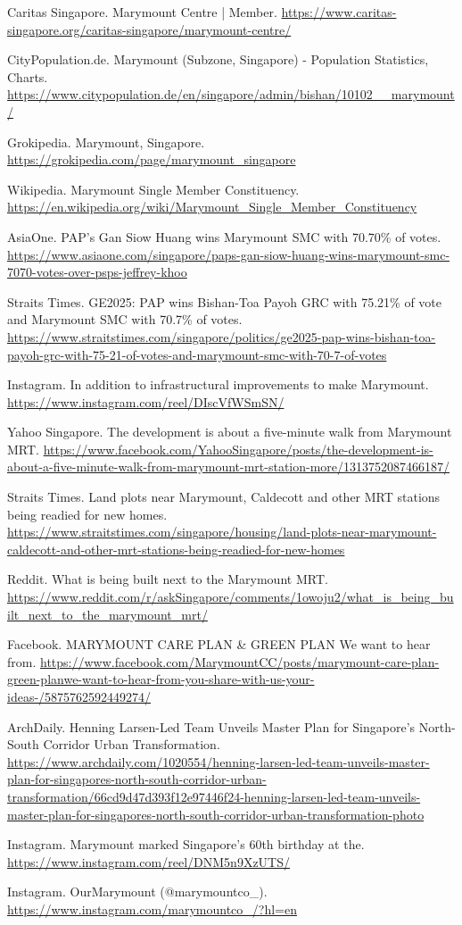 \documentclass[11pt,a4paper,twoside,openany]{book}
\begin{document}
\begin{enumerate}[label={[\arabic*]},leftmargin=*,topsep=2pt,itemsep=1pt,parsep=0pt]
  \item Caritas Singapore. Marymount Centre | Member. \url{https://www.caritas-singapore.org/caritas-singapore/marymount-centre/}
  \item CityPopulation.de. Marymount (Subzone, Singapore) - Population Statistics, Charts. \url{https://www.citypopulation.de/en/singapore/admin/bishan/10102__marymount/}
  \item Grokipedia. Marymount, Singapore. \url{https://grokipedia.com/page/marymount_singapore}
  \item Wikipedia. Marymount Single Member Constituency. \url{https://en.wikipedia.org/wiki/Marymount_Single_Member_Constituency}
  \item AsiaOne. PAP's Gan Siow Huang wins Marymount SMC with 70.70\% of votes. \url{https://www.asiaone.com/singapore/paps-gan-siow-huang-wins-marymount-smc-7070-votes-over-psps-jeffrey-khoo}
  \item Straits Times. GE2025: PAP wins Bishan-Toa Payoh GRC with 75.21\% of vote and Marymount SMC with 70.7\% of votes. \url{https://www.straitstimes.com/singapore/politics/ge2025-pap-wins-bishan-toa-payoh-grc-with-75-21-of-votes-and-marymount-smc-with-70-7-of-votes}
  \item Instagram. In addition to infrastructural improvements to make Marymount. \url{https://www.instagram.com/reel/DIscVfWSmSN/}
  \item Yahoo Singapore. The development is about a five-minute walk from Marymount MRT. \url{https://www.facebook.com/YahooSingapore/posts/the-development-is-about-a-five-minute-walk-from-marymount-mrt-station-more/1313752087466187/}
  \item Straits Times. Land plots near Marymount, Caldecott and other MRT stations being readied for new homes. \url{https://www.straitstimes.com/singapore/housing/land-plots-near-marymount-caldecott-and-other-mrt-stations-being-readied-for-new-homes}
  \item Reddit. What is being built next to the Marymount MRT. \url{https://www.reddit.com/r/askSingapore/comments/1owoju2/what_is_being_built_next_to_the_marymount_mrt/}
  \item Facebook. MARYMOUNT CARE PLAN \& GREEN PLAN We want to hear from. \url{https://www.facebook.com/MarymountCC/posts/marymount-care-plan-green-planwe-want-to-hear-from-you-share-with-us-your-ideas-/5875762592449274/}
  \item ArchDaily. Henning Larsen-Led Team Unveils Master Plan for Singapore’s North-South Corridor Urban Transformation. \url{https://www.archdaily.com/1020554/henning-larsen-led-team-unveils-master-plan-for-singapores-north-south-corridor-urban-transformation/66cd9d47d393f12e97446f24-henning-larsen-led-team-unveils-master-plan-for-singapores-north-south-corridor-urban-transformation-photo}
  \item Instagram. Marymount marked Singapore's 60th birthday at the. \url{https://www.instagram.com/reel/DNM5n9XzUTS/}
  \item Instagram. OurMarymount (@marymountco\_). \url{https://www.instagram.com/marymountco_/?hl=en}
\end{enumerate}
\end{document}
